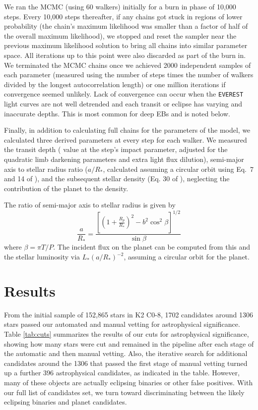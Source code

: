 \documentclass[twocolumn]{aastex62}
\newcommand{\pipeline}[1]{\texttt{#1}}
\newcommand{\numstars}{152,865}
\newcommand{\nsystems}{1306}
\newcommand{\nastro}{1702}
\newcommand{\nmulti}{396}
\begin{document}
We ran the MCMC (using 60 walkers) initially for a burn in phase of
10,000 steps. Every 10,000 steps thereafter, if any chains got stuck
in regions of lower probability (the chain's maximum likelihood was
smaller than a factor of half of the overall maximum likelihood), we
stopped and reset the sampler near the previous maximum likelihood
solution to bring all chains into similar parameter space. All
iterations up to this point were also discarded as part of the burn
in. We terminated the MCMC chains once we achieved 2000 independent
samples of each parameter (measured using the number of steps times
the number of walkers divided by the longest autocorrelation length)
or one million iterations if convergence seemed unlikely. Lack of
convergence can occur when the \pipeline{EVEREST} light curves are not
well detrended and each transit or eclipse has varying and inaccurate
depths. This is most common for deep EBs and is noted below.

Finally, in addition to calculating full chains for the parameters of
the model, we calculated three derived parameters at every step for
each walker.  We measured the transit depth (\cite{man02} value at the
step's impact parameter, adjusted for the quadratic limb darkening
parameters and extra light flux dilution), semi-major axis to stellar
radius ratio ($a/R_*$, calculated assuming a circular orbit using
Eq.\ 7 and 14 of \cite{win10}), and the subsequent stellar density
(Eq. 30 of \cite{win10}), neglecting the contribution of the planet to
the density.

The ratio of semi-major axis to stellar radius is given by
\begin{equation}
\frac{a}{R_*} = \frac{\left[\left(1 + \frac{R_p}{R_*}\right)^2 - b^2 \cos^2\beta\right]^{1/2}}
{\sin \beta}
\end{equation}
where $\beta = \pi T/P$.  The incident flux on the planet can be
computed from this and the stellar luminosity via $L_* (a/R_*)^{-2}$,
assuming a circular orbit for the planet.


\section{Results} \label{results}

From the initial sample of \numstars{} stars in K2 C0-8, \nastro{}
candidates around \nsystems{} stars passed our automated and manual
vetting for astrophysical significance. Table \ref{tab:cuts}
summarizes the results of our cuts for astrophysical significance,
showing how many stars were cut and remained in the pipeline after
each stage of the automatic and then manual vetting. Also, the
iterative search for additional candidates around the \nsystems{} that
passed the first stage of manual vetting turned up a further \nmulti{}
astrophysical candidates, as indicated in the table. However, many of
these objects are actually eclipsing binaries or other false
positives. With our full list of candidates set, we turn toward
discriminating between the likely eclipsing binaries and planet
candidates.
\end{document}
